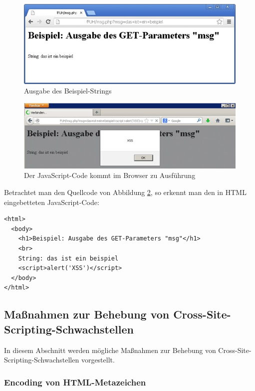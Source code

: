 \begin{figure}[htbp]
 \centering
 \includegraphics[scale=.75]{abbildungen/xss_1}
 \caption{Ausgabe des Beispiel-Strings}
 \label{fig:xss_1} 
\end{figure}

\begin{figure}[htbp]
 \centering
 \includegraphics[scale=.75]{abbildungen/xss_2}
 \caption{Der JavaScript-Code kommt im Browser zu Ausführung}
 \label{fig:xss_2} 
\end{figure}

\newpage
Betrachtet man den Quellcode von Abbildung \ref{fig:xss_2}, so 
erkennt man den in HTML eingebetteten JavaScript-Code:

\begin{lstlisting}[basicstyle=\ttfamily\footnotesize]
<html>
  <body>
    <h1>Beispiel: Ausgabe des GET-Parameters "msg"</h1>
    <br>
    String: das ist ein beispiel
    <script>alert('XSS')</script>
  </body>
</html>
\end{lstlisting}

\subsection{Maßnahmen zur Behebung von Cross-Site-Scripting-Schwachstellen}
	
In diesem Abschnitt werden mögliche Maßnahmen zur Behebung von 
Cross-Site-Scripting-Schwachstellen vorgestellt.

\subsubsection{Encoding von HTML-Metazeichen}
	
